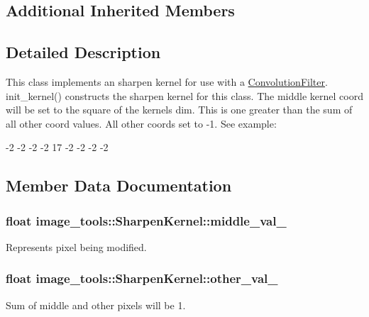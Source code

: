 \subsection*{Additional Inherited Members}


\subsection{Detailed Description}
This class implements an sharpen kernel for use with a \hyperlink{classimage__tools_1_1ConvolutionFilter}{Convolution\+Filter}. init\+\_\+kernel() constructs the sharpen kernel for this class. The middle kernel coord will be set to the square of the kernel\textquotesingle{}s dim. This is one greater than the sum of all other coord values. All other coords set to -\/1. See example\+: 

-\/2 -\/2 -\/2 -\/2 17 -\/2 -\/2 -\/2 -\/2 

\subsection{Member Data Documentation}
\subsubsection[{\texorpdfstring{middle\+\_\+val\+\_\+}{middle_val_}}]{\setlength{\rightskip}{0pt plus 5cm}float image\+\_\+tools\+::\+Sharpen\+Kernel\+::middle\+\_\+val\+\_\+\hspace{0.3cm}{\ttfamily [private]}}\hypertarget{classimage__tools_1_1SharpenKernel_ad9221cccfe79053e95ba227de19413ac}{}\label{classimage__tools_1_1SharpenKernel_ad9221cccfe79053e95ba227de19413ac}
Represents pixel being modified. 
\subsubsection[{\texorpdfstring{other\+\_\+val\+\_\+}{other_val_}}]{\setlength{\rightskip}{0pt plus 5cm}float image\+\_\+tools\+::\+Sharpen\+Kernel\+::other\+\_\+val\+\_\+\hspace{0.3cm}{\ttfamily [private]}}\hypertarget{classimage__tools_1_1SharpenKernel_a12daec6c34459fc770e4d8310e9f7475}{}\label{classimage__tools_1_1SharpenKernel_a12daec6c34459fc770e4d8310e9f7475}
Sum of middle and other pixels will be 1. 

